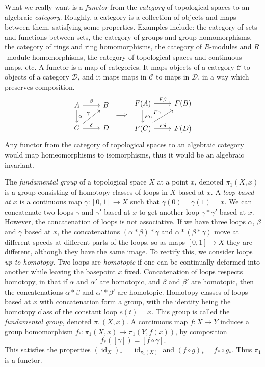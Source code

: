\documentclass[a4paper,11pt]{article}
\begin{document}
      What we really want is a \textit{functor} from the \textit{category} of topological spaces to an algebraic \textit{category}. Roughly, a category is a collection of objects and maps between them, satisfying some properties. Examples include: the category of sets and functions between sets, the category of groups and group homomorphisms, the category of rings and ring homomorphisms, the category of \(R\)-modules and \(R\)-module homomorphisms, the category of topological spaces and continuous maps, etc. A functor is a map of categories. It maps objects of a category \(\mathcal{C}\) to objects of a category \(\mathcal{D}\), and it maps maps in \(\mathcal{C}\) to maps in \(\mathcal{D}\), in a way which preserves composition.
      \[
        \begin{tikzcd}
          A \arrow[d,"\alpha"] \arrow[r,"\beta"] & B\\
          C \arrow[ur,"\gamma"] \arrow[r,"\delta"] & D
        \end{tikzcd}
        \implies
        \begin{tikzcd}
          F(A) \arrow[d,"F\alpha"] \arrow[r,"F\beta"] & F(B) \\
          F(C) \arrow[ur,"F\gamma"] \arrow[r,"F\delta"] & F(D)
        \end{tikzcd}
      \]
      Any functor from the category of topological spaces to an algebraic category would map homeomorphisms to isomorphisms, thus it would be an algebraic invariant.

      The \textit{fundamental group} of a topological space \(X\) at a point \(x\), denoted \(\pi_1(X,x)\) is a group consisting of homotopy classes of loops in \(X\) based at \(x\). A \textit{loop based at \(x\)} is a continuous map \(\gamma: [0,1] \to X\) such that \(\gamma(0) = \gamma(1) = x\). We can concatenate two loops \(\gamma\) and \(\gamma'\) based at \(x\) to get another loop \(\gamma * \gamma'\) based at \(x\). However, the concatenation of loops is not associative. If we have three loops \(\alpha\), \(\beta\) and \(\gamma\) based at \(x\), the concatenations \((\alpha * \beta) * \gamma\) and \(\alpha * (\beta * \gamma)\) move at different speeds at different parts of the loops, so as maps \([0,1] \to X\) they are different, although they have the same image. To rectify this, we consider loops \textit{up to homotopy}. Two loops are \textit{homotopic} if one can be continually deformed into another while leaving the basepoint \(x\) fixed. Concatenation of loops respects homotopy, in that if \(\alpha\) and \(\alpha'\) are homotopic, and \(\beta\) and \(\beta'\) are homotopic, then the concatenations \(\alpha * \beta\) and \(\alpha' * \beta'\) are homotopic. Homotopy classes of loops based at \(x\) with concatenation form a group, with the identity being the homotopy class of the constant loop \(e(t) = x\). This group is called the \textit{fundamental group}, denoted \(\pi_1(X, x)\). A continuous map \(f: X \to Y\) induces a group homomorphism \(f_*: \pi_1(X,x) \to \pi_1(Y,f(x))\), by composition
      \[
        f_*([\gamma]) = [f \circ \gamma].
      \]
      This satisfies the properties \((\operatorname{id}_X)_* = \operatorname{id}_{\pi_1(X)}\) and \((f \circ g)_* = f_* \circ g_*\). Thus \(\pi_1\) is a functor.
\end{document}
